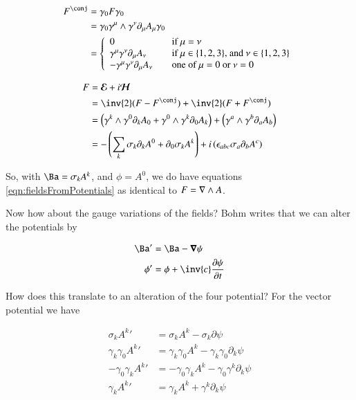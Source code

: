 \documentclass{article}
\newcommand{\EE}[0]{\boldsymbol{\mathcal{E}}}
\newcommand{\HH}[0]{\boldsymbol{\mathcal{H}}}
\begin{document}
\begin{align*}
F^\conj &=\gamma_0 F \gamma_0 \\
&= \gamma_0 \gamma^\mu \wedge \gamma^\nu \partial_\mu A_\mu \gamma_0 \\
&=
\left\{
\begin{array}{l l}
0 & \quad \mbox{if $\mu = \nu$} \\
\gamma^\mu \gamma^\nu \partial_\mu A_\nu & \quad \mbox{if $\mu \in \{1,2,3\}$, and $\nu \in \{1,2,3\}$} \\
-\gamma^\mu \gamma^\nu \partial_\mu A_\nu & \quad \mbox{one of $\mu = 0$ or $\nu = 0$ } \\
\end{array} \right.
\end{align*}

\begin{align*}
F 
&= \EE + i\HH \\
&= \inv{2}(F - F^\conj) + \inv{2}(F + F^\conj) \\
&= \left(\gamma^k \wedge \gamma^0 \partial_k A_0 +\gamma^0 \wedge \gamma^k \partial_0 A_k\right) + \left(\gamma^a \wedge \gamma^b \partial_a A_b\right) \\
&= -\left(\sum_k \sigma_k \partial_k A^0 + \partial_0 \sigma_k A^k\right) + i\left(\epsilon_{abc}\sigma_a \partial_b A^c\right) \\
\end{align*}

So, with $\Ba = \sigma_k A^k$, and $\phi = A^0$, we do have equations \ref{eqn:fieldsFromPotentials} as identical to $F = \nabla \wedge A$.

Now how about the gauge variations of the fields?  Bohm writes that we can alter the potentials by

\begin{align}\label{eqn:gauge}
\Ba' &= \Ba - \spacegrad \psi \\
\phi' &= \phi + \inv{c}\PD{t}{\psi}
\end{align}

How does this translate to an alteration of the four potential?  For the vector potential we have

\begin{align*}
\sigma_k {A^k}' &= \sigma_k A^k - \sigma_k \partial \psi \\
\gamma_k \gamma_0 {A^k}' &= \gamma_k \gamma_0 A^k - \gamma_k \gamma_0 \partial_k \psi \\
-\gamma_0 \gamma_k {A^k}' &= -\gamma_0 \gamma_k A^k - \gamma_0 \gamma^k \partial_k \psi \\
\gamma_k {A^k}' &= \gamma_k A^k + \gamma^k \partial_k \psi \\
\end{align*}
\end{document}
